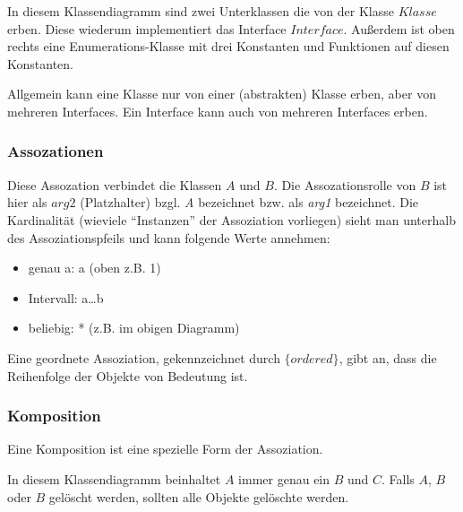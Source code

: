 \documentclass[a4paper,parskip=half*,DIV=7,fontsize=11pt]{scrartcl}
\begin{document}
In diesem Klassendiagramm sind zwei Unterklassen die von der Klasse $\textit{Klasse}$ erben. Diese wiederum implementiert das Interface $\textit{Interface}$. Außerdem ist oben rechts eine Enumerations-Klasse mit drei Konstanten und Funktionen auf diesen Konstanten.

Allgemein kann eine Klasse nur von einer (abstrakten) Klasse erben, aber von mehreren Interfaces. Ein Interface kann auch von mehreren Interfaces erben.

\subsubsection{Assozationen}

Diese Assozation verbindet die Klassen $\textit{A}$ und $\textit{B}$. Die Assozationsrolle von $\textit{B}$ ist hier als $\textit{arg2}$ (Platzhalter) bzgl. \textit{A} bezeichnet bzw. als \textit{arg1} bezeichnet. Die Kardinalität (wieviele ``Instanzen''  der Assoziation vorliegen) sieht man unterhalb des Assoziationspfeils und kann folgende Werte annehmen:
\begin{itemize}
\item genau a: a (oben z.B. 1)
\item Intervall: a\ldots b
\item beliebig: * (z.B. im obigen Diagramm)
\end{itemize}

Eine geordnete Assoziation, gekennzeichnet durch $\textit{\{ordered\}}$, gibt an, dass die Reihenfolge der Objekte von Bedeutung ist.

\subsubsection{Komposition}
Eine Komposition ist eine spezielle Form der Assoziation.


In diesem Klassendiagramm beinhaltet $\textit{A}$ immer genau ein $\textit{B}$  und $\textit{C}$. Falls $\textit{A}$, $\textit{B}$ oder $\textit{B}$ gelöscht werden, sollten alle Objekte gelöschte werden.
\end{document}
